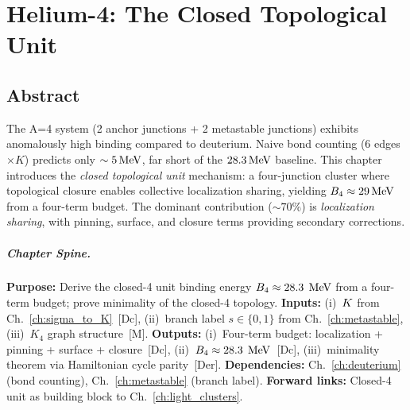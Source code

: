 
\chapter{Helium-4: The Closed Topological Unit}
\label{ch:helium4}


\section*{Abstract}

The A=4 system (2 anchor junctions + 2 metastable junctions) exhibits
anomalously high binding compared to deuterium. Naive bond counting
(6 edges $\times K$) predicts only $\sim 5\,\mathrm{MeV}$, far short of the
$28.3\,\mathrm{MeV}$ baseline. This chapter introduces the \emph{closed topological
unit} mechanism: a four-junction cluster where topological closure
enables collective localization sharing, yielding $B_4 \approx 29\,\mathrm{MeV}$
from a four-term budget. The dominant contribution ($\sim 70\%$) is
\emph{localization sharing}, with pinning, surface, and closure terms
providing secondary corrections.

\paragraph{Chapter Spine.}
\textbf{Purpose:} Derive the closed-4 unit binding energy $B_4 \approx 28.3\;\,\mathrm{MeV}$
from a four-term budget; prove minimality of the closed-4 topology.
\textbf{Inputs:} (i)~$K$ from Ch.~\ref{ch:sigma_to_K}~[Dc],
(ii)~branch label $s \in \{0,1\}$ from Ch.~\ref{ch:metastable},
(iii)~$K_4$ graph structure~[M].
\textbf{Outputs:} (i)~Four-term budget: localization + pinning + surface + closure~[Dc],
(ii)~$B_4 \approx 28.3\;\,\mathrm{MeV}$~[Dc],
(iii)~minimality theorem via Hamiltonian cycle parity~[Der].
\textbf{Dependencies:} Ch.~\ref{ch:deuterium} (bond counting), Ch.~\ref{ch:metastable} (branch label).
\textbf{Forward links:} Closed-4 unit as building block to Ch.~\ref{ch:light_clusters}.

